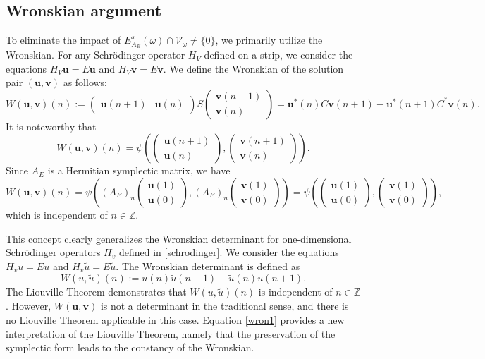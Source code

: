 \documentclass[11pt]{amsart}
\theoremstyle{remark}
\theoremstyle{definition}
\begin{document}
\subsection{Wronskian argument}\label{comproof}
To eliminate the impact of $E^s_{A_E}(\omega) \cap \mathcal{V}_\omega \neq \{0\}$, we primarily utilize the Wronskian. For any Schr\"odinger operator $H_V$ defined on a strip, we consider the equations $H_{V}\mathbf{u}=E\mathbf{u}$ and $H_{V}\mathbf{v}=E\mathbf{v}$. We define the Wronskian of the solution pair $(\mathbf{u},\mathbf{v})$ as follows:
$$
W(\mathbf{u},\mathbf{v})(n):=\begin{pmatrix}
\mathbf{u}(n+1) & \mathbf{u}(n)
\end{pmatrix} S \begin{pmatrix}
\mathbf{v}(n+1) \\ \mathbf{v}(n)
\end{pmatrix} =\mathbf{u}^*(n)C\mathbf{v}(n+1) - \mathbf{u}^*(n+1)C^*\mathbf{v}(n).
$$
It is noteworthy that
$$
W(\mathbf{u},\mathbf{v})(n)=\psi\left(\begin{pmatrix}
\mathbf{u}(n+1)\\\mathbf{u}(n)
\end{pmatrix},\begin{pmatrix}
\mathbf{v}(n+1)\\\mathbf{v}(n)
\end{pmatrix}\right).
$$
Since $A_E$ is a Hermitian symplectic matrix, we have
\begin{equation}\label{wron1}
W(\mathbf{u},\mathbf{v})(n)=\psi\left((A_E)_n\begin{pmatrix}
\mathbf{u}(1)\\\mathbf{u}(0)
\end{pmatrix},(A_E)_n\begin{pmatrix}
\mathbf{v}(1)\\\mathbf{v}(0)
\end{pmatrix}\right)=\psi\left(\begin{pmatrix}
\mathbf{u}(1)\\\mathbf{u}(0)
\end{pmatrix},\begin{pmatrix}
\mathbf{v}(1)\\\mathbf{v}(0)
\end{pmatrix}\right),
\end{equation}
which is independent of $n\in\mathbb{Z}$.


This concept clearly generalizes the Wronskian determinant for one-dimensional Schr\"odinger operators $H_v$ defined in \eqref{schrodinger}. We consider the equations $H_vu=Eu$ and $H_v\tilde{u}=E\tilde{u}$. The Wronskian determinant is defined as
$$
W(u,\tilde{u})(n):=u(n)\tilde{u}(n+1)-\tilde{u}(n)u(n+1).
$$
The Liouville Theorem demonstrates that $W(u,\tilde{u})(n)$ is independent of $n\in\mathbb{Z}$ \cite{DF}. However, $W(\mathbf{u},\mathbf{v})$ is not a determinant in the traditional sense, and there is no Liouville Theorem applicable in this case. Equation \eqref{wron1} provides a new interpretation of the Liouville Theorem, namely that the preservation of the symplectic form leads to the constancy of the Wronskian.
\end{document}
